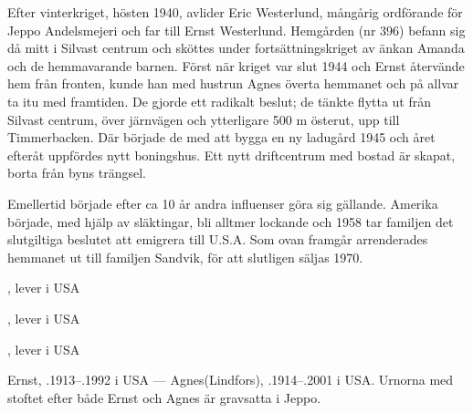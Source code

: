 Efter vinterkriget, hösten 1940, avlider Eric Westerlund, mångårig ordförande för Jeppo Andelsmejeri och far till Ernst Westerlund. Hemgården (nr 396) befann sig då mitt i Silvast centrum och sköttes under fortsättningskriget av änkan Amanda och de hemmavarande barnen.	Först när kriget var slut 1944 och Ernst återvände hem från fronten, kunde han med hustrun Agnes överta hemmanet och på allvar ta itu med framtiden. De gjorde ett radikalt beslut; de tänkte flytta ut från Silvast centrum, över järnvägen och ytterligare 500 m österut, upp till Timmerbacken. Där började de med att bygga en ny ladugård 1945 och året efteråt uppfördes nytt boningshus. Ett nytt driftcentrum med bostad är skapat, borta från byns trängsel.

Emellertid började efter ca 10 år andra influenser göra sig gällande. Amerika började, med hjälp av släktingar, bli alltmer lockande och 1958 tar familjen det slutgiltiga beslutet att emigrera till U.S.A. Som ovan framgår arrenderades hemmanet ut till familjen Sandvik, för att slutligen säljas 1970.
\begin{jhchildren}
  \item {}, lever i USA
  \item {}, lever i USA
  \item {}, lever i USA
\end{jhchildren}
Ernst, .1913--.1992 i USA  ---  Agnes(Lindfors), .1914--.2001 i USA. Urnorna med stoftet efter både Ernst och Agnes är gravsatta i Jeppo.
